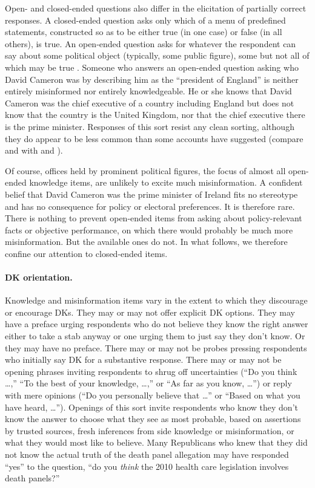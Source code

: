 \documentclass[11pt]{article}
\begin{document}
Open- and closed-ended questions also differ in the elicitation of partially correct responses. A closed-ended question asks only which of a menu of predefined statements, constructed so as to be either true (in one case) or false (in all others), is true. An open-ended question asks for whatever the respondent can say about some political object (typically, some public figure), some but not all of which may be true \citep[see][]{luskin2011}. Someone who answers an open-ended question asking who David Cameron was by describing him as the ``president of England'' is neither entirely misinformed nor entirely knowledgeable. He or she knows that David Cameron was the chief executive of a country including England but does not know that the country is the United Kingdom, nor that the chief executive there is the prime minister. Responses of this sort resist any clean sorting, although they do appear to be less common than some accounts have suggested (compare \citealt{luskin2011} and \citealt{debell2013} with \citealt{krosnick2008} and \citealt{gibson2009}).

Of course, offices held by prominent political figures, the focus of almost all open-ended knowledge items, are unlikely to excite much misinformation. A confident belief that David Cameron was the prime minister of Ireland fits no stereotype and has no consequence for policy or electoral preferences. It is therefore rare. There is nothing to prevent open-ended items from asking about policy-relevant facts or objective performance, on which there would probably be much more misinformation. But the available ones do not. In what follows, we therefore confine our attention to closed-ended items.

\paragraph{DK orientation.} Knowledge and misinformation items vary in the extent to which they discourage or encourage DKs. They may or may not offer explicit DK options. They may have a preface urging respondents who do not believe they know the right answer either to take a stab anyway or one urging them to just say they don't know. Or they may have no preface. There may or may not be probes pressing respondents who initially say DK for a substantive response. There may or may not be opening phrases inviting respondents to shrug off uncertainties (``Do you think \ldots,'' ``To the best of your knowledge, \ldots,'' or ``As far as you know, \ldots'') or reply with mere opinions (``Do you personally believe that \ldots'' or ``Based on what you have heard, \ldots''). Openings of this sort invite respondents who know they don't know the answer to choose what they see as most probable, based on assertions by trusted sources, fresh inferences from side knowledge or misinformation, or what they would most like to believe. Many Republicans who knew that they did not know the actual truth of the death panel allegation may have responded ``yes'' to the question, ``do you \emph{think} the 2010 health care legislation involves death panels?''
\end{document}
